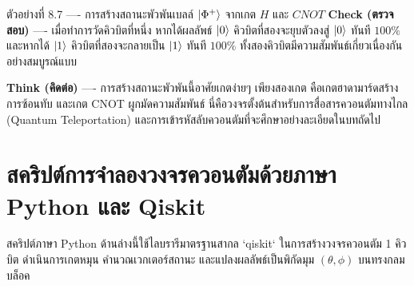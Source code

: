 \begin{psctbox}{ตัวอย่างที่ 8.7 ---- การสร้างสถานะพัวพันเบลล์ $\ket{\Phi^+}$ จากเกต $H$ และ $CNOT$}
\textbf{Check (ตรวจสอบ)} ---- เมื่อทำการวัดคิวบิตที่หนึ่ง หากได้ผลลัพธ์ $\ket{0}$ คิวบิตที่สองจะยุบตัวลงสู่ $\ket{0}$ ทันที $100\%$ และหากได้ $\ket{1}$ คิวบิตที่สองจะกลายเป็น $\ket{1}$ ทันที $100\%$ ทั้งสองคิวบิตมีความสัมพันธ์เกี่ยวเนื่องกันอย่างสมบูรณ์แบบ

\textbf{Think (คิดต่อ)} ---- การสร้างสถานะพัวพันนี้อาศัยเกตง่ายๆ เพียงสองเกต คือเกตฮาดามาร์ดสร้างการซ้อนทับ และเกต CNOT ผูกมัดความสัมพันธ์ นี่คือวงจรตั้งต้นสำหรับการสื่อสารควอนตัมทางไกล (Quantum Teleportation) และการเข้ารหัสลับควอนตัมที่จะศึกษาอย่างละเอียดในบทถัดไป
\end{psctbox}

\section{สคริปต์การจำลองวงจรควอนตัมด้วยภาษา Python และ Qiskit}

สคริปต์ภาษา Python ด้านล่างนี้ใช้ไลบรารีมาตรฐานสากล `qiskit` ในการสร้างวงจรควอนตัม 1 คิวบิต ดำเนินการเกตหมุน คำนวณเวกเตอร์สถานะ และแปลงผลลัพธ์เป็นพิกัดมุม $(\theta, \phi)$ บนทรงกลมบล็อค

